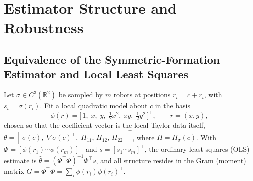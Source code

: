 \documentclass[journal]{IEEEtran}
\newcommand{\R}{\mathbb{R}}
\begin{document}
\section{Estimator Structure and Robustness}

\subsection{Equivalence of the Symmetric-Formation Estimator and Local Least Squares}
\label{sec:equiv}

Let $\sigma\in C^{3}(\R^{2})$ be sampled by $m$ robots at positions
$r_{i}=c+\bar r_{i}$, with $s_{i}=\sigma(r_{i})$. Fit a local quadratic model
about $c$ in the basis
\begin{equation}
\phi(\bar r)=\big[\,1,\;x,\;y,\;\tfrac12 x^{2},\;xy,\;\tfrac12 y^{2}\,\big]^{\!\top},
\qquad \bar r=(x,y),
\end{equation}
chosen so that the coefficient vector is the local Taylor data itself,
$\theta=[\,\sigma(c),\;\nabla\sigma(c)^{\!\top},\;H_{11},\,H_{12},\,H_{22}\,]^{\!\top}$,
where $H=H_{\sigma}(c)$. With $\Phi=[\phi(\bar r_{1})\cdots\phi(\bar r_{m})]^{\!\top}$
and $s=[s_{1}\cdots s_{m}]^{\!\top}$, the ordinary least-squares (OLS) estimate is
$\hat\theta=(\Phi^{\!\top}\Phi)^{-1}\Phi^{\!\top}s$, and all structure resides in the
Gram (moment) matrix $G=\Phi^{\!\top}\Phi=\sum_{i}\phi(\bar r_{i})\phi(\bar r_{i})^{\!\top}$.
\end{document}
